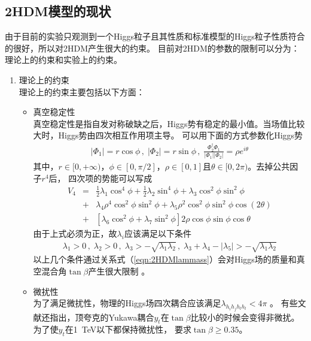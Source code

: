 \subsection{2HDM模型的现状}
由于目前的实验只观测到一个Higgs粒子且其性质和标准模型的Higgs粒子性质符合的很好，所以对2HDM产生很大的约束。
目前对2HDM的参数的限制可以分为：理论上的约束和实验上的约束。

\begin{enumerate}
\item 理论上的约束 \\
理论上的约束主要包括以下方面：
\begin{itemize}
\item 真空稳定性\\
真空稳定性是指自发对称破缺之后，Higgs势有稳定的最小值。当场值比较大时，Higgs势由四次相互作用项主导。
可以用下面的方式参数化Higgs势\cite{Osland:2hdm}
\begin{eqnarray}
|\Phi_1| = r\cos\phi\,,\; |\Phi_2| = r\sin\phi\,,\; 
\frac{\Phi^{\dagger}_2\Phi_1}{|\Phi_1||\Phi_2|} = \rho e^{i\theta} 
\end{eqnarray}
其中，$r\in[0,+\infty)$，$\phi\in[0,\pi/2]$，$\rho\in[0,1]$且$\theta\in[0,2\pi)$。去掉公共因子$r^4$后，
四次项的势能可以写成
\begin{eqnarray}
V_4 &=& \frac{1}{2}\lambda_1\cos^4\phi + \frac{1}{2}\lambda_2\sin^4\phi + 
\lambda_3\cos^2\phi\sin^2\phi 
\nonumber \\
&+& \lambda_4\rho^4\cos^2\phi\sin^2\phi + \lambda_5\rho^2\cos^2\phi\sin^2\phi\cos(2\theta) 
\nonumber \\
&+& [\lambda_6\cos^2\phi + \lambda_7\sin^2\phi]2\rho\cos\phi\sin\phi\cos\theta
\end{eqnarray}
由于上式必须为正，故$\lambda_i$应该满足以下条件
\begin{eqnarray}
\lambda_1 > 0 \,,\; \lambda_2 > 0\,,\; \lambda_3 > -\sqrt{\lambda_1\lambda_2}\,,\;
\lambda_3 + \lambda_4 - |\lambda_5| > -\sqrt{\lambda_1\lambda_2}
\end{eqnarray}
以上几个条件通过关系式（\ref{eqn:2HDMlammass}）会对Higgs场的质量和真空混合角$\tan\beta$产生很大限制
\cite{Deshpande:2hdm,Sher:2hdm,Osland:2hdm}。

\item 微扰性\\
为了满足微扰性，物理的Higgs场四次耦合应该满足$\lambda_{h_i h_j h_l h_l} < 4\pi$
\cite{TL:unitarity,Ginzburg:unitarity}。
有些文献还指出，顶夸克的Yukawa耦合$y_t$在$\tan\beta$比较小的时候会变得非微扰。
为了使$y_t$在1~TeV以下都保持微扰性， 要求$\tan\beta \ge 0.35$\cite{Bijnens:2hdm}。


\end{itemize}
\end{enumerate}
